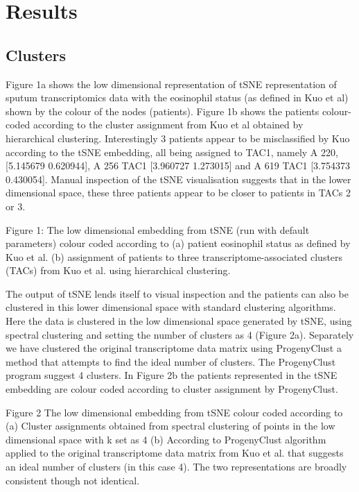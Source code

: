 \documentclass[9pt,twocolumn,twoside]{pnas-new}
\begin{document}
\section*{Results}

\subsection{Clusters}

Figure 1a shows the low dimensional representation of tSNE representation of sputum transcriptomics data with the eosinophil status (as defined in Kuo et al) shown by the colour of the nodes (patients). Figure 1b shows the patients colour-coded according to the cluster assignment from Kuo et al obtained by hierarchical clustering. Interestingly 3 patients appear to be misclassified by Kuo according to the tSNE embedding, all being assigned to TAC1, namely A 220, [5.145679 0.620944], A 256 TAC1 [3.960727 1.273015] and A 619 TAC1 [3.754373 0.430054]. Manual inspection of the tSNE visualisation suggests that in the lower dimensional space, these three patients appear to be closer to patients in TACs 2 or 3.  

Figure 1: The low dimensional embedding from tSNE (run with default parameters) colour coded according to (a) patient eosinophil status as defined by Kuo et al. (b) assignment of patients to three transcriptome-associated clusters (TACs) from Kuo et al. using hierarchical clustering. 

The output of tSNE lends itself to visual inspection and the patients can also be clustered in this lower dimensional space with standard clustering algorithms. Here the data is clustered in the low dimensional space generated by tSNE, using spectral clustering and setting the number of clusters as 4 (Figure 2a). Separately we have clustered the original transcriptome data matrix using ProgenyClust a method that attempts to find the ideal number of clusters. The ProgenyClust program suggest 4 clusters. In Figure 2b the patients represented in the tSNE embedding are colour coded according to cluster assignment by ProgenyClust. 


Figure 2 The low dimensional embedding from tSNE colour coded according to (a) Cluster assignments obtained from spectral clustering of points in the low dimensional space with k set as 4 (b) According to ProgenyClust algorithm applied to the original transcriptome data matrix from Kuo et al. that suggests an ideal number of clusters (in this case 4). The two representations are broadly consistent though not identical.
\end{document}
